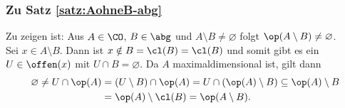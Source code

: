 %
            

\subsubsection{Zu Satz \ref{satz:AohneB-abg}}\label{anh:AohneB-abg}
    Zu zeigen ist: Aus $A \in \CO$, $B \in \abg$ und $A \setminus B \neq \varnothing$ folgt $\op(A \setminus B) \neq \varnothing$.\\
    Sei $x \in A \setminus B$. Dann ist $x \notin B = \cl(B) = \cl(B)$ und somit gibt es ein ${U \in \offen(x)}$ mit ${U \cap B = \varnothing}$. Da $A$ maximaldimensional ist, gilt dann
    \begin{align*}
        \varnothing \neq U \cap \op(A) 
        &= (U \setminus B) \cap \op(A) 
        = U \cap (\op(A) \setminus B) 
        \subseteq \op(A) \setminus B \\
        &= \op(A) \setminus \cl(B) 
        = \op(A \setminus B).
    \end{align*}
    

